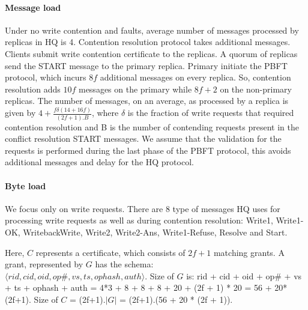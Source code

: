 \documentclass[twocolumn,10pt]{article}
\begin{document}
\paragraph{Message load} Under no write contention and faults, average number of messages processed
by replicas in HQ is 4. Contention resolution protocol takes additional messages. Clients submit 
write contention certificate to the replicas. A quorum of replicas send the START message
to the primary replica. Primary initiate the PBFT protocol, which incurs $8f$ additional messages 
on every replica. So, contention resolution adds $10f$ messages on the primary while $8f+2$ on the
non-primary replicas. The number of messages, on an average, as processed by a replica 
is given by $4+\frac{f\delta(14+16f)}{(2f+1).B}$, where $\delta$ is the fraction of write 
requests that required contention resolution and B is the number of contending requests present
in the conflict resolution START messages. 
We assume that the validation for the requests is performed during
the last phase of the PBFT protocol, this avoids additional messages and delay for the HQ protocol.



\paragraph{Byte load}
We focus only on write requests.
There are 8 type of messages HQ uses for processing write requests as well as during contention
resolution: Write1, Write1-OK, WritebackWrite, Write2, Write2-Ans, Write1-Refuse, Resolve
and Start. 

Here, $C$ represents a certificate, which consists of $2f+1$ matching grants. 
A grant, represented
by $G$ has the schema:\\ $\langle rid, cid, oid, op\#, vs, ts, ophash, auth\rangle$.
Size of $G$ is: rid + cid + oid + op\# + vs + ts + ophash + auth = 4*3 + 8 + 8 + 8 + 20 + 
(2f + 1) * 
20 = 56 + 20*(2f+1). Size of $C$ = (2f+1).$|G|$ = (2f+1).(56 + 20 * (2f + 1)).
\end{document}
